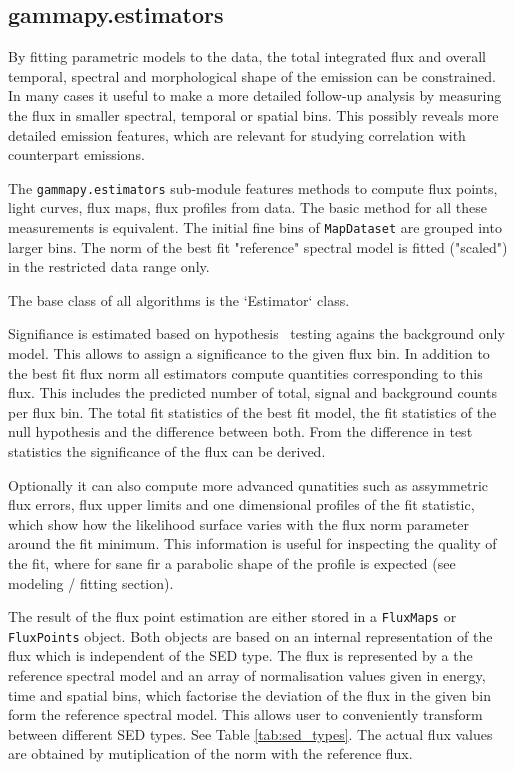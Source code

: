 \subsection{gammapy.estimators}
\label{ssec:gammapy-estimators}
By fitting parametric models to the data, the total integrated
flux and overall temporal, spectral and morphological shape of the
\gammaray emission can be constrained. In many cases it useful
to make a more detailed follow-up analysis by measuring the
flux in smaller spectral, temporal or spatial bins. This
possibly reveals more detailed emission features, which
are relevant for studying correlation with counterpart emissions.

The \verb|gammapy.estimators| sub-module features methods to compute flux
points, light curves, flux maps, flux profiles from data.
The basic method for all these measurements is equivalent.
The initial fine bins of \verb|MapDataset| are grouped into
larger bins. The norm of the best fit "reference" spectral
model is fitted ("scaled") in the  restricted data range only.

The base class of all algorithms is the `Estimator`  class.

Signifiance is estimated based on hypothesis \
testing agains the background only model. This allows
to assign a significance to the given flux bin.
In addition to the best fit flux norm all estimators compute
quantities corresponding to this flux. This includes
the predicted number of total, signal and background
counts per flux bin. The total fit statistics
of the best fit model, the fit statistics of the
null hypothesis and the difference between both.
From the difference in test statistics the significance
of the flux can be derived.

Optionally it can also compute more advanced qunatities
such as assymmetric flux errors, flux upper limits
and one dimensional profiles of the fit statistic,
which show how the likelihood surface varies with
the flux norm parameter around the fit minimum.
This information is useful  for inspecting the quality
of the fit, where for  sane fir a parabolic
shape of the profile is expected (see modeling / fitting section).

The result of the flux point estimation are either stored in a
\verb|FluxMaps| or \verb|FluxPoints| object. Both objects
are based on an internal representation of the flux which is
independent of the SED type. The flux is represented by a
the reference spectral model and an array of
normalisation values given in energy, time and spatial bins,
which factorise the deviation of the flux in the given
bin form the reference spectral model. This allows
user to conveniently transform between different
SED types. See Table \ref{tab:sed_types}.
The actual flux values are obtained by mutiplication of the norm with the
reference flux.

